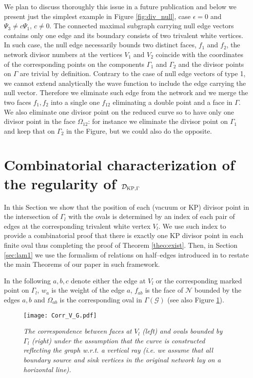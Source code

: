\documentclass[11pt]{amsart}
\theoremstyle{plain}
\numberwithin{equation}{section}
\def \DKP {{\mathcal D}_{\textup{\scriptsize KP},\Gamma}}
\begin{document}
We plan to discuss thoroughly this issue in a future publication and below we present just the simplest example in Figure \ref{fig:div_null}, case $\epsilon =0$ and $\Psi_3 \ne c \Psi_1$, $c\not =0$.
The connected maximal subgraph carrying null edge vectors contains only one edge and its boundary consists of two trivalent white vertices. In such case, the null edge necessarily bounds two distinct faces, $f_1$ and $f_2$, the network divisor numbers at the vertices $V_1$ and $V_2$ coincide with the coordinates of the corresponding points on the components $\Gamma_1$ and $\Gamma_2$ and the divisor points on $\Gamma$ are trivial by definition. Contrary to the case of null edge vectors of type 1, we cannot extend analytically the wave function to include the edge carrying the null vector. Therefore we eliminate such edge from the network and we merge the two faces $f_1,f_2$ into a single one $f_{12}$ eliminating a double point and a face in $\Gamma$. We also eliminate one divisor point on the reduced curve so to have only one divisor point in the face $\Omega_{12}$: for instance we eliminate the divisor point on $\Gamma_1$ and keep that on $\Gamma_2$ in the Figure, but we could also do the opposite.

\section{Combinatorial characterization of the regularity of $\DKP$}\label{sec:comb}

In this Section we show that the position of each (vacuum or KP) divisor point in the intersection of $\Gamma_l$ with the ovals is determined by an index of each pair of edges at the corresponding trivalent white vertex $V_l$. We use such index to provide a combinatorial proof that there is exactly one KP divisor point in each finite oval thus completing the proof of Theorem \ref{theo:exist}. Then, in Section \ref{sec:lam1} we use the formalism of relations on half--edges introduced in \cite{Lam2} to restate the main Theorems of our paper in such framework.

In the following $a,b,c$ denote either the edge at $V_l$ or the corresponding marked point on $\Gamma_l$, $w_a$ is the weight of the edge $a$, $f_{ab}$ is the face of ${\mathcal N}$ bounded by the edges $a,b$ and $\Omega_{ab}$ is the corresponding oval in $\Gamma(\mathcal G)$ (see also Figure \ref{fig:corr_V_G}).
\begin{figure}%
  \centering
  \texttt{[image: Corr\_V\_G.pdf]}
	\vspace{-2.5 truecm}
  \caption{\small{\sl The correspondence between faces at $V_l$ (left) and ovals bounded by $\Gamma_l$ (right) under the assumption that the curve is constructed reflecting the graph w.r.t. a vertical ray ({\sl i.e.} we assume that all boundary source and sink vertices in the original network lay on a horizontal line).}}
	\label{fig:corr_V_G}
\end{figure}
\end{document}
